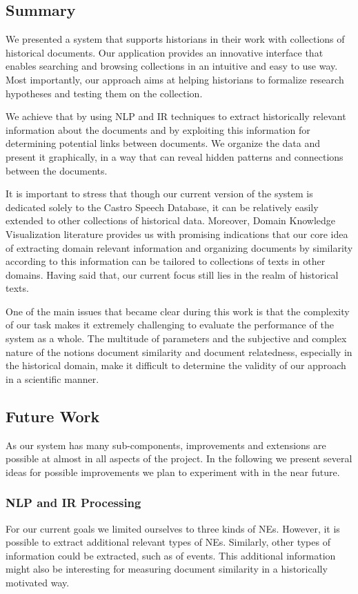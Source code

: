 \subsection {Summary}
\label{sec:summary}

We presented a system that supports historians in their work with collections of historical documents. 
Our application provides an innovative interface that enables searching and browsing collections in an intuitive and easy to use way.
Most importantly, our approach aims at helping historians to formalize research hypotheses and testing them on the collection.

We achieve that by using NLP and IR techniques to extract historically relevant information about the documents and by exploiting
this information for determining potential links between documents. We organize the data and present it graphically,
in a way that can reveal hidden patterns and connections between the documents.
 
It is important to stress that though our current version of the system is dedicated solely to the Castro Speech Database, 
it can be relatively easily extended to other collections of historical data. Moreover, Domain Knowledge Visualization literature
provides us with promising indications that our core idea of extracting domain relevant information and organizing documents by similarity 
according to this information can be tailored to collections of texts in other domains. Having said that, our current focus still lies in the realm of historical texts. 

One of the main issues that became clear during this work is that the complexity of our task makes it extremely challenging to evaluate the performance of the system as a whole. The multitude of parameters and the subjective and complex nature of the notions document similarity and document relatedness, especially in the historical domain, make it difficult to determine the validity of our approach in a scientific manner. 

\subsection {Future Work}
\label{sec:future_work}
As our system has many sub-components, improvements and extensions are possible
at almost in all aspects of the project. In the following we present several ideas for possible improvements we plan to experiment with in the
near future.

\subsubsection{NLP and IR Processing}
\label{sec:future_work_NLP}
For our current goals we limited ourselves to three kinds of NEs. 
However, it is possible to extract additional relevant types of NEs. 
Similarly, other types of information could be extracted, such as of events. This additional information might also be interesting for measuring 
document similarity in a historically motivated way.  

